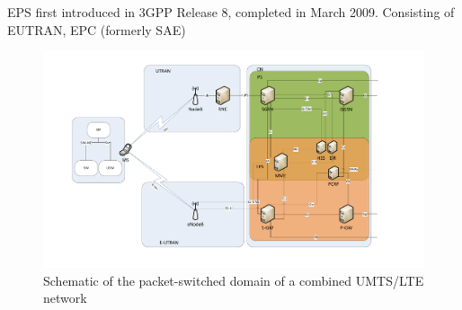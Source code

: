 EPS first introduced in 3GPP Release 8, completed in March 2009. Consisting of EUTRAN, EPC (formerly SAE)


\begin{figure}[htb]
	\centering
 	\includegraphics[width=1.3\textwidth]{images/eps_ps-overview.pdf}
 	\caption{Schematic of the packet-switched domain of a combined UMTS/LTE network}
 	\label{c4:fig:psdomain}
\end{figure}

